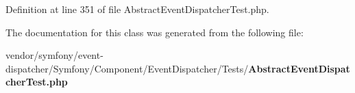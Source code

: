 Definition at line 351 of file Abstract\+Event\+Dispatcher\+Test.\+php.



The documentation for this class was generated from the following file\+:\begin{DoxyCompactItemize}
\item 
vendor/symfony/event-\/dispatcher/\+Symfony/\+Component/\+Event\+Dispatcher/\+Tests/{\bf Abstract\+Event\+Dispatcher\+Test.\+php}\end{DoxyCompactItemize}

